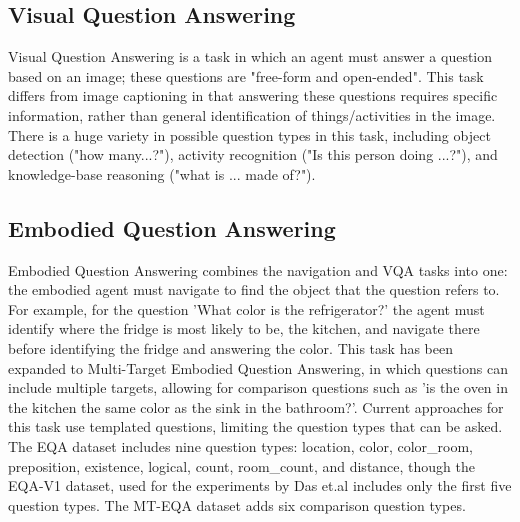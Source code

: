\documentclass{article}
\begin{document}
\subsection{Visual Question Answering}
Visual Question Answering is a task in which an agent must answer a question based on an image; these questions are "free-form and open-ended"\cite{vqa_2015}. This task differs from image captioning in that answering these questions requires specific information, rather than general identification of things/activities in the image. There is a huge variety in possible question types in this task, including object detection ("how many...?"), activity recognition ("Is this person doing ...?"), and knowledge-base reasoning ("what is ... made of?"). 

\subsection{Embodied Question Answering}
Embodied Question Answering combines the navigation and VQA tasks into one: the embodied agent must navigate to find the object that the question refers to\cite{embodiedqa}. For example, for the question 'What color is the refrigerator?' the agent must identify where the fridge is most likely to be, the kitchen, and navigate there before identifying the fridge and answering the color. This task has been expanded to Multi-Target Embodied Question Answering, in which questions can include multiple targets, allowing for comparison questions such as 'is the oven in the kitchen the same color as the sink in the bathroom?'\cite{eqa_multitarget}. Current approaches for this task use templated questions, limiting the question types that can be asked. The EQA dataset includes nine question types: location, color, color\_room, preposition, existence, logical, count, room\_count, and distance, though the EQA-V1 dataset, used for the experiments by Das et.al includes only the first five question types\cite{embodiedqa}. The MT-EQA dataset adds six comparison question types\cite{eqa_multitarget}.


\end{document}
